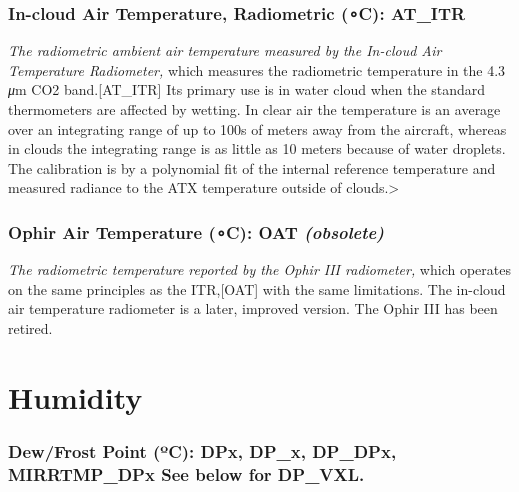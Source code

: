 \documentclass[
]{book}
\begin{document}
\hypertarget{AT-ITR}{%
\subsubsection*{\texorpdfstring{In-cloud Air Temperature, Radiometric ({∘}C): AT\_ITR}{In-cloud Air Temperature, Radiometric (∘C): AT\_ITR}}\label{AT-ITR}}

\emph{The radiometric ambient air temperature measured by the In-cloud Air Temperature Radiometer,} which measures the radiometric temperature in the 4.3 {\emph{μ}}m CO{2} band.\protect\hypertarget{AT_ITR}{}{{[}AT\_ITR{]}} Its primary use is in water cloud when the standard thermometers are affected by wetting. In clear air the temperature is an average over an integrating range of up to 100s of meters away from the aircraft, whereas in clouds the integrating range is as little as 10 meters because of water droplets. The calibration is by a polynomial fit of the internal reference temperature and measured radiance to the ATX temperature outside of clouds.\textgreater{}

\hypertarget{ophir-air-temperature-c-oat-obsolete}{%
\subsubsection{\texorpdfstring{Ophir Air Temperature ({∘}C): OAT \emph{(obsolete)}}{Ophir Air Temperature (∘C): OAT (obsolete)}}\label{ophir-air-temperature-c-oat-obsolete}}

\emph{The radiometric temperature reported by the Ophir III radiometer,} which operates on the same principles as the ITR,\protect\hypertarget{OAT}{}{{[}OAT{]}} with the same limitations. The in-cloud air temperature radiometer is a later, improved version. The Ophir III has been retired.

\hypertarget{humidity}{%
\section{Humidity}\label{humidity}}

\hypertarget{dew-point}{%
\subsubsection*{\texorpdfstring{Dew/Frost Point ({º}C): DPx, DP\_x, DP\_DPx, MIRRTMP\_DPx See below for DP\_VXL.}{Dew/Frost Point (ºC): DPx, DP\_x, DP\_DPx, MIRRTMP\_DPx See below for DP\_VXL.}}\label{dew-point}}
\end{document}
